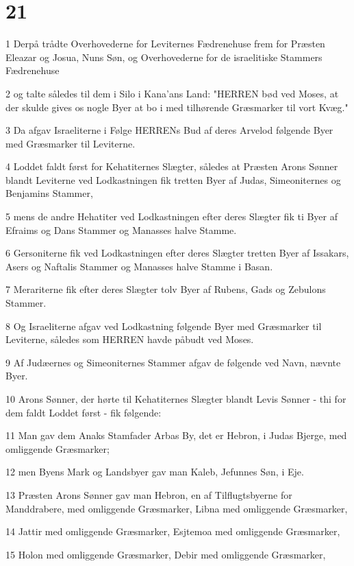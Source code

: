 \chapter{21}

\par 1 Derpå trådte Overhovederne for Leviternes Fædrenehuse frem for Præsten Eleazar og Josua, Nuns Søn, og Overhovederne for de israelitiske Stammers Fædrenehuse
\par 2 og talte således til dem i Silo i Kana'ans Land: "HERREN bød ved Moses, at der skulde gives os nogle Byer at bo i med tilhørende Græsmarker til vort Kvæg."
\par 3 Da afgav Israeliterne i Følge HERRENs Bud af deres Arvelod følgende Byer med Græsmarker til Leviterne.
\par 4 Loddet faldt først for Kehatiternes Slægter, således at Præsten Arons Sønner blandt Leviterne ved Lodkastningen fik tretten Byer af Judas, Simeoniternes og Benjamins Stammer,
\par 5 mens de andre Hehatiter ved Lodkastningen efter deres Slægter fik ti Byer af Efraims og Dans Stammer og Manasses halve Stamme.
\par 6 Gersoniterne fik ved Lodkastningen efter deres Slægter tretten Byer af Issakars, Asers og Naftalis Stammer og Manasses halve Stamme i Basan.
\par 7 Merariterne fik efter deres Slægter tolv Byer af Rubens, Gads og Zebulons Stammer.
\par 8 Og Israeliterne afgav ved Lodkastning følgende Byer med Græsmarker til Leviterne, således som HERREN havde påbudt ved Moses.
\par 9 Af Judæernes og Simeoniternes Stammer afgav de følgende ved Navn, nævnte Byer.
\par 10 Arons Sønner, der hørte til Kehatiternes Slægter blandt Levis Sønner - thi for dem faldt Loddet først - fik følgende:
\par 11 Man gav dem Anaks Stamfader Arbas By, det er Hebron, i Judas Bjerge, med omliggende Græsmarker;
\par 12 men Byens Mark og Landsbyer gav man Kaleb, Jefunnes Søn, i Eje.
\par 13 Præsten Arons Sønner gav man Hebron, en af Tilflugtsbyerne for Manddrabere, med omliggende Græsmarker, Libna med omliggende Græsmarker,
\par 14 Jattir med omliggende Græsmarker, Esjtemoa med omliggende Græsmarker,
\par 15 Holon med omliggende Græsmarker, Debir med omliggende Græsmarker,
